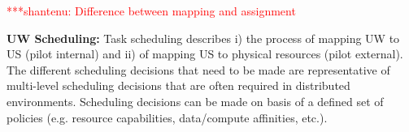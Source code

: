 \documentclass[conference,final]{IEEEtran}
\newcommand{\jhanote}[1]{ {\textcolor{red} { ***shantenu: #1 }}}
\newcommand{\alnote}[1]{ {\textcolor{blue} { ***andre: #1 }}}
\newcommand{\alnote}[1]{}
\newcommand{\jhanote}[1]{}
\begin{document}
\jhanote{Difference between mapping and assignment}

\textbf{UW Scheduling:} Task scheduling describes i) the process of
mapping UW to US (pilot internal) and ii) of mapping US to physical
resources (pilot external).  The different scheduling decisions that
need to be made are representative of multi-level scheduling decisions
that are often required in distributed environments.  Scheduling
decisions can be made on basis of a defined set of policies
(e.g. resource capabilities, data/compute affinities, etc.).


	
	
\end{document}
